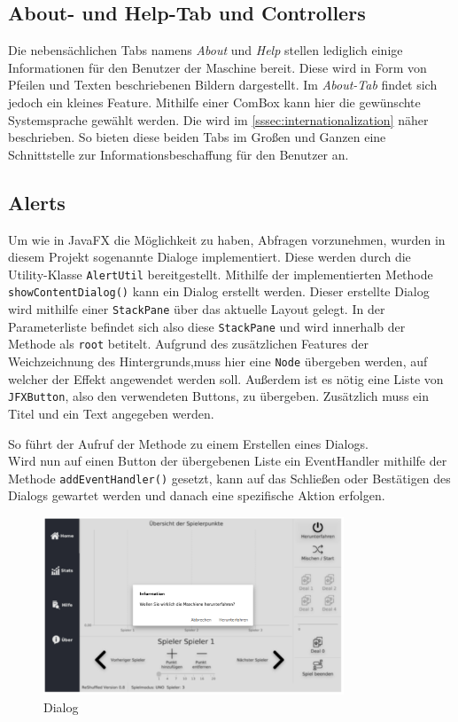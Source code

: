 \subsection{About- und Help-Tab und Controllers}
Die nebensächlichen Tabs namens \textit{About} und \textit{Help} stellen lediglich einige Informationen für den Benutzer der Maschine bereit.
Diese wird in Form von Pfeilen und Texten beschriebenen Bildern dargestellt.
Im \textit{About-Tab} findet sich jedoch ein kleines Feature.
Mithilfe einer ComBox kann hier die gewünschte Systemsprache gewählt werden.
Die  wird im \autoref{sssec:internationalization} näher beschrieben.
So bieten diese beiden Tabs im Großen und Ganzen eine Schnittstelle zur Informationsbeschaffung für den Benutzer an.
\subsection{Alerts}\label{sssec:alert}
Um wie in JavaFX die Möglichkeit zu haben, Abfragen vorzunehmen, wurden in diesem Projekt sogenannte Dialoge implementiert.
Diese werden durch die Utility-Klasse \lstinline[style=java]{AlertUtil} bereitgestellt.
Mithilfe der implementierten Methode \lstinline[style=java]{showContentDialog()} kann ein Dialog erstellt werden.
Dieser erstellte Dialog wird mithilfe einer \lstinline[style=java]{StackPane} über das aktuelle Layout gelegt.
In der Parameterliste befindet sich also diese \lstinline[style=java]{StackPane} und wird innerhalb der Methode als \lstinline[style=java]{root} betitelt.
Aufgrund des zusätzlichen Features der Weichzeichnung des Hintergrunds,muss hier eine \lstinline[style=java]{Node} übergeben werden, auf welcher der Effekt angewendet werden soll.
Außerdem ist es nötig eine Liste von \lstinline[style=java]{JFXButton}, also den verwendeten Buttons, zu übergeben.
Zusätzlich muss ein Titel und ein Text angegeben werden.

So führt der Aufruf der Methode zu einem Erstellen eines Dialogs.\\
Wird nun auf einen Button der übergebenen Liste ein EventHandler mithilfe der Methode \lstinline[style=java]{addEventHandler()} gesetzt,
kann auf das Schließen oder Bestätigen des Dialogs gewartet werden und danach eine spezifische Aktion erfolgen.
\begin{figure}[H]
\centering
\includegraphics[width=0.8\textwidth]{fig/ainf/Shutdown-Dialog.png}
\caption{Dialog}
\label{shutdown}
\end{figure}
